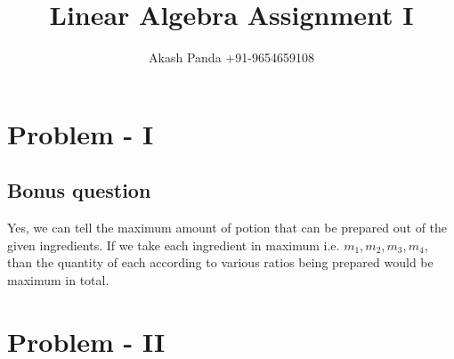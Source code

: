 \documentclass[runningheads]{llncs}
\begin{document}
%
\title{Linear Algebra Assignment I}
%
%
\author{Akash Panda {+91-9654659108}}
%
%
%
\maketitle              %
%
%
%
%
\section{Problem - I}
\subsection{Bonus question}
Yes, we can tell the maximum amount of potion that can be prepared out of the given ingredients. 
If we take each ingredient in maximum i.e. $m_1,m_2,m_3,m_4$, than the quantity of each according to various ratios being prepared would be maximum in total. 


\section{Problem - II}
\end{document}
